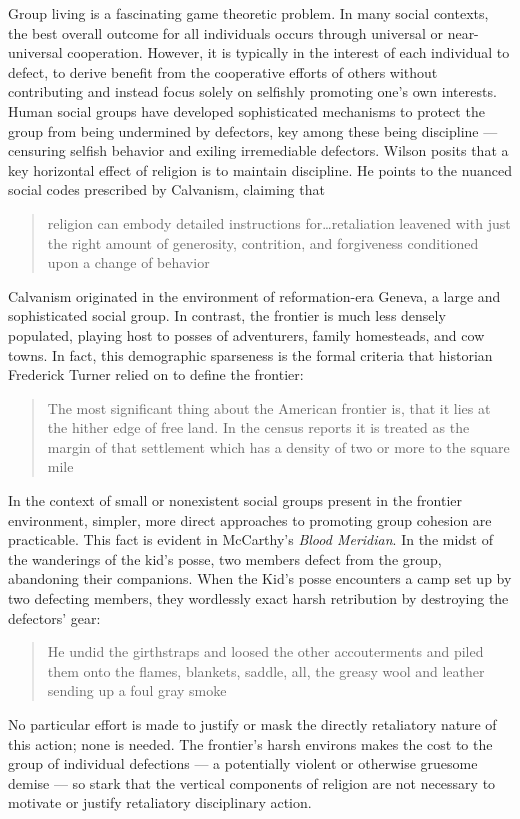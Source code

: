 Group living is a fascinating game theoretic problem.
In many social contexts, the best overall outcome for all individuals occurs through universal or near-universal cooperation.
However, it is typically in the interest of each individual to defect, to derive benefit from the cooperative efforts of others without contributing and instead focus solely on selfishly promoting one's own interests.
Human social groups have developed sophisticated mechanisms to protect the group from being undermined by defectors, key among these being discipline --- censuring selfish behavior and exiling irremediable defectors.
Wilson posits that a key horizontal effect of religion is to maintain discipline.
He points to the nuanced social codes prescribed by Calvanism, claiming that
\blockcquote[p 250]{Wilson2007EvolutionLives}{
religion can embody detailed instructions for\ldots retaliation leavened with just the right amount of generosity, contrition, and forgiveness conditioned upon a change of behavior
}.
Calvanism originated in the environment of reformation-era Geneva, a large and sophisticated social group.
In contrast, the frontier is much less densely populated, playing host to posses of adventurers, family homesteads, and cow towns.
In fact, this demographic sparseness is the formal criteria that historian Frederick Turner relied on to define the frontier:
\blockcquote{Turner1894TheHistory}{
The most significant thing about the American frontier is, that it lies at the hither edge of free land.
In the census reports it is treated as the margin of that settlement which has a density of two or more to the square mile
}.
In the context of small or nonexistent social groups present in the frontier environment, simpler, more direct approaches to promoting group cohesion are practicable.
This fact is evident in McCarthy's \textit{Blood Meridian}.
In the midst of the wanderings of the kid's posse, two members defect from the group, abandoning their companions.
When the Kid's posse encounters a camp set up by two defecting members, they wordlessly exact harsh retribution by destroying the defectors' gear:
\blockcquote[p 112]{McCarthy1992BloodWest}{
He undid the girthstraps and loosed the other accouterments and piled them onto the flames, blankets, saddle, all, the greasy wool and leather sending up a foul gray smoke
}.
No particular effort is made to justify or mask the directly retaliatory nature of this action; none is needed.
The frontier's harsh environs makes the cost to the group of individual defections --- a potentially violent or otherwise gruesome demise --- so stark that the vertical components of religion are not necessary to motivate or justify retaliatory disciplinary action.
